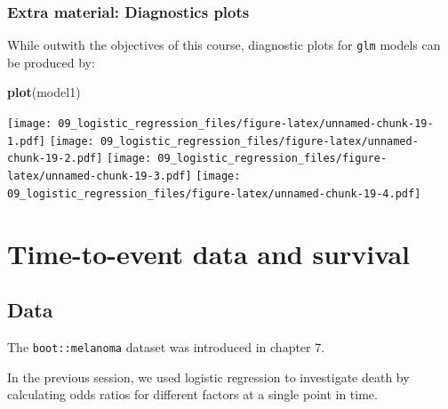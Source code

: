 \documentclass[12pt,]{krantz}
\makeatletter
\newenvironment{Shaded}{\begin{snugshade}}{\end{snugshade}}
\newcommand{\KeywordTok}[1]{\textcolor[rgb]{0.13,0.29,0.53}{\textbf{#1}}}
\newcommand{\NormalTok}[1]{#1}
\newenvironment{kframe}{%
\medskip{}
\setlength{\fboxsep}{.8em}
 \def\at@end@of@kframe{}%
 \ifinner\ifhmode%
  \def\at@end@of@kframe{\end{minipage}}%
  \begin{minipage}{\columnwidth}%
 \fi\fi%
 \def\FrameCommand##1{\hskip\@totalleftmargin \hskip-\fboxsep
 \colorbox{shadecolor}{##1}\hskip-\fboxsep
     \hskip-\linewidth \hskip-\@totalleftmargin \hskip\columnwidth}%
 \MakeFramed {\advance\hsize-\width
   \@totalleftmargin\z@ \linewidth\hsize
   \@setminipage}}%
 {\par\unskip\endMakeFramed%
 \at@end@of@kframe}
\renewenvironment{Shaded}{\begin{kframe}}{\end{kframe}}
\theoremstyle{definition}
\theoremstyle{definition}
\theoremstyle{definition}
\theoremstyle{remark}
\makeatother
\begin{document}
\hypertarget{extra-material-diagnostics-plots}{%
\subsection{Extra material: Diagnostics
plots}\label{extra-material-diagnostics-plots}}

While outwith the objectives of this course, diagnostic plots for
\texttt{glm} models can be produced by:

\begin{Shaded}
\begin{Highlighting}[]
\KeywordTok{plot}\NormalTok{(model1)}
\end{Highlighting}
\end{Shaded}

\texttt{[image: 09\_logistic\_regression\_files/figure-latex/unnamed-chunk-19-1.pdf]}
\texttt{[image: 09\_logistic\_regression\_files/figure-latex/unnamed-chunk-19-2.pdf]}
\texttt{[image: 09\_logistic\_regression\_files/figure-latex/unnamed-chunk-19-3.pdf]}
\texttt{[image: 09\_logistic\_regression\_files/figure-latex/unnamed-chunk-19-4.pdf]}

\hypertarget{time-to-event-data-and-survival}{%
\chapter{Time-to-event data and
survival}\label{time-to-event-data-and-survival}}

\hypertarget{data-4}{%
\section{Data}\label{data-4}}

The \texttt{boot::melanoma} dataset was introduced in chapter 7.

In the previous session, we used logistic regression to investigate
death by calculating odds ratios for different factors at a single point
in time.
\end{document}
